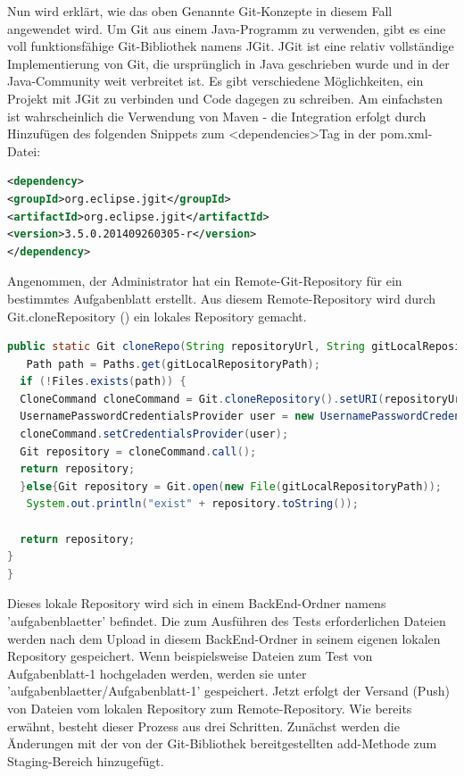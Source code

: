 \documentclass[apaper4,12p]{scrartcl}
\begin{document}
Nun wird erklärt, wie das oben Genannte Git-Konzepte in diesem Fall angewendet wird. 
\newline
Um Git aus einem Java-Programm zu verwenden, gibt es eine voll funktionsfähige Git-Bibliothek namens JGit. JGit ist eine relativ vollständige Implementierung von Git, die ursprünglich in Java geschrieben wurde und in der Java-Community weit verbreitet ist.
Es gibt verschiedene Möglichkeiten, ein Projekt mit JGit zu verbinden und Code dagegen zu schreiben. Am einfachsten ist wahrscheinlich die Verwendung von Maven - die Integration erfolgt durch Hinzufügen des folgenden Snippets zum <dependencies>Tag in der pom.xml-Datei:
\begin{lstlisting}[language=XML,caption=JGit-dependency ]
<dependency>
<groupId>org.eclipse.jgit</groupId>
<artifactId>org.eclipse.jgit</artifactId>
<version>3.5.0.201409260305-r</version>
</dependency>
\end{lstlisting} 
Angenommen, der Administrator hat ein Remote-Git-Repository für ein bestimmtes Aufgabenblatt erstellt. Aus diesem Remote-Repository wird durch Git.cloneRepository () ein lokales Repository gemacht.
\begin{lstlisting}[language=JAVA,caption=clone Repository ]
public static Git cloneRepo(String repositoryUrl, String gitLocalRepositoryPath, String tfsUser, String password) throws GitAPIException, IOException {
   Path path = Paths.get(gitLocalRepositoryPath);
  if (!Files.exists(path)) {
  CloneCommand cloneCommand = Git.cloneRepository().setURI(repositoryUrl).setDirectory(new File(gitLocalRepositoryPath));
  UsernamePasswordCredentialsProvider user = new UsernamePasswordCredentialsProvider(tfsUser, password);
  cloneCommand.setCredentialsProvider(user);
  Git repository = cloneCommand.call();
  return repository;
  }else{Git repository = Git.open(new File(gitLocalRepositoryPath));
   System.out.println("exist" + repository.toString());

  return repository;
}
}
\end{lstlisting} 
Dieses lokale Repository wird sich in einem BackEnd-Ordner namens 'aufgabenblaetter' befindet. Die zum Ausführen des Tests erforderlichen Dateien werden nach dem Upload in diesem BackEnd-Ordner in seinem eigenen lokalen Repository gespeichert. Wenn beispielsweise Dateien zum Test von Aufgabenblatt-1 hochgeladen werden, werden sie unter 'aufgabenblaetter/Aufgabenblatt-1' gespeichert.
\newline
Jetzt erfolgt der Versand (Push) von Dateien vom lokalen Repository zum Remote-Repository. Wie bereits erwähnt, besteht dieser Prozess aus drei Schritten. Zunächst werden die Änderungen mit der von der Git-Bibliothek bereitgestellten add-Methode zum Staging-Bereich hinzugefügt.
\end{document}
